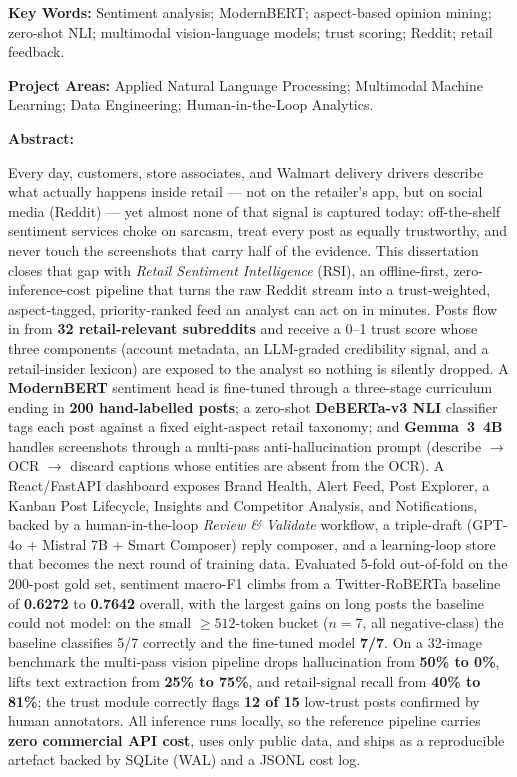 \vspace{4pt}
\noindent\textbf{Key Words:} Sentiment analysis; ModernBERT; aspect-based opinion mining;
zero-shot NLI; multimodal vision-language models; trust scoring; Reddit; retail feedback.

\vspace{2pt}
\noindent\textbf{Project Areas:} Applied Natural Language Processing; Multimodal Machine
Learning; Data Engineering; Human-in-the-Loop Analytics.

\vspace{4pt}
\noindent\textbf{Abstract:}
{\small
Every day, customers, store associates, and Walmart delivery drivers describe what actually
happens inside retail --- not on the retailer's app, but on social media (Reddit) --- yet
almost none of that signal is captured today: off-the-shelf sentiment
services choke on sarcasm, treat every post as equally trustworthy, and
never touch the screenshots that carry half of the evidence.  This
dissertation closes that gap with \emph{Retail Sentiment Intelligence}
(RSI), an offline-first, zero-inference-cost pipeline that turns the raw
Reddit stream into a trust-weighted, aspect-tagged, priority-ranked feed
an analyst can act on in minutes.  Posts flow in from \textbf{32
retail-relevant subreddits} and receive a 0--1 trust score whose three
components (account metadata, an LLM-graded credibility signal, and a
retail-insider lexicon) are exposed to the analyst so nothing is silently
dropped.  A \textbf{ModernBERT} sentiment head is fine-tuned through a
three-stage curriculum ending in \textbf{200 hand-labelled posts}; a
zero-shot \textbf{DeBERTa-v3 NLI} classifier tags each post against a
fixed eight-aspect retail taxonomy; and \textbf{Gemma~3~4B} handles
screenshots through a multi-pass anti-hallucination prompt (describe
$\to$ OCR $\to$ discard captions whose entities are absent from the
OCR).  A React/FastAPI dashboard exposes Brand Health, Alert Feed, Post
Explorer, a Kanban Post Lifecycle, Insights and Competitor Analysis, and
Notifications, backed by a human-in-the-loop \emph{Review \& Validate}
workflow, a triple-draft (GPT-4o + Mistral 7B + Smart Composer) reply
composer, and a learning-loop store that becomes the next round of
training data.
Evaluated 5-fold out-of-fold on the 200-post gold set, sentiment
macro-F1 climbs from a Twitter-RoBERTa baseline of \textbf{0.6272} to
\textbf{0.7642} overall, with the largest gains on long posts the
baseline could not model: on the small $\ge 512$-token bucket
($n{=}7$, all negative-class) the baseline classifies 5/7 correctly
and the fine-tuned model \textbf{7/7}.  On a 32-image benchmark the
multi-pass vision pipeline drops hallucination from \textbf{50\% to
0\%}, lifts text extraction from \textbf{25\% to 75\%}, and
retail-signal recall from \textbf{40\% to 81\%}; the trust module
correctly flags \textbf{12 of 15} low-trust posts confirmed by human
annotators.  All inference runs locally, so the reference pipeline
carries \textbf{zero commercial API cost}, uses only public data, and
ships as a reproducible artefact backed by SQLite (WAL) and a JSONL
cost log.
\par}

